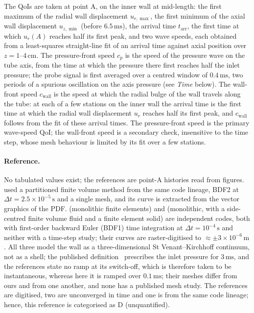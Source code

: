 The QoIs are taken at point A, on the inner wall at mid-length: the first maximum of the radial wall displacement $u_{r,\max}$, the first minimum of the axial wall displacement $u_{z,\min}$ (before $6.5\,\mathrm{ms}$), the arrival time $t_\mathrm{arr}$, the first time at which $u_r(A)$ reaches half its first peak, and two wave speeds, each obtained from a least-squares straight-line fit of an arrival time against axial position over $z = 1$--$4\,\mathrm{cm}$. The pressure-front speed $c_p$ is the speed of the pressure wave on the tube axis, from the time at which the pressure there first reaches half the inlet pressure; the probe signal is first averaged over a centred window of $0.4\,\mathrm{ms}$, two periods of a spurious oscillation on the axis pressure (see \emph{Time} below). The wall-front speed $c_\mathrm{wall}$ is the speed at which the radial bulge of the wall travels along the tube: at each of a few stations on the inner wall the arrival time is the first time at which the radial wall displacement $u_r$ reaches half its first peak, and $c_\mathrm{wall}$ follows from the fit of these arrival times.
The pressure-front speed is the primary wave-speed QoI; the wall-front speed is a secondary check, insensitive to the time step, whose mesh behaviour is limited by its fit over a few stations.

\paragraph{Reference.}
No tabulated values exist; the references are point-A histories read from figures.
\citet{Tukovic2018} used a partitioned finite volume method from the same code lineage, BDF2 at $\Delta t = 2.5\times10^{-5}\,\mathrm{s}$ and a single mesh, and its curve is extracted from the vector graphics of the PDF.
\citet{Lozovskiy2019} (monolithic finite elements) and \citet{Eken2016} (monolithic, with a side-centred finite volume fluid and a finite element solid) are independent codes, both with first-order backward Euler (BDF1) time integration at $\Delta t = 10^{-4}\,\mathrm{s}$ and neither with a time-step study; their curves are raster-digitised to $\approx\pm3\times10^{-6}\,\mathrm{m}$.
All three model the wall as a three-dimensional St Venant--Kirchhoff continuum, not as a shell; the published definition~\citep{Fernandez2005} prescribes the inlet pressure for $3\,\mathrm{ms}$, and the references state no ramp at its switch-off, which is therefore taken to be instantaneous, whereas here it is ramped over $0.1\,\mathrm{ms}$; their meshes differ from ours and from one another, and none has a published mesh study.
The references are digitised, two are unconverged in time and one is from the same code lineage; hence, this reference is categorised as D (unquantified).

